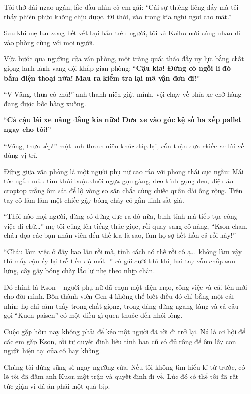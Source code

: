 \documentclass[../main.tex]{subfiles}
\begin{document}
Tôi thở dài ngao ngán, lắc đầu nhìn cô em gái: ``Cái sự thiêng liêng đấy mà tôi thấy phiền phức không chịu được. Đi thôi, vào trong kia nghỉ ngơi cho mát.''

Sau khi mẹ lau xong hết vết bụi bẩn trên người, tôi và Kaiho mới cùng nhau đi vào phòng cùng với mọi người.

Vừa bước qua ngưỡng cửa văn phòng, một tràng quát tháo đầy uy lực bằng chất giọng lanh lảnh vang dội khắp gian phòng: ``\textbf{Cậu kia! Đừng có ngồi lì đó bấm điện thoại nữa! Mau ra kiểm tra lại mã vận đơn đi!}''

``V-Vâng, thưa cô chủ!'' anh thanh niên giật mình, vội chạy về phía xe chở hàng đang được bốc hàng xuống.

``\textbf{Cả cậu lái xe nâng đằng kia nữa! Đưa xe vào góc kệ số ba xếp pallet ngay cho tôi!}''

``Vâng, thưa sếp!'' một anh thanh niên khác đáp lại, cẩn thận đưa chiếc xe lùi về đúng vị trí.

Đứng giữa văn phòng là một người phụ nữ cao ráo với phong thái cực ngầu: Mái tóc ngắn màu tím khói buộc đuôi ngựa gọn gàng, đeo kính gọng đen, diện áo croptop trắng ôm sát để lộ vòng eo săn chắc cùng chiếc quần dài ống rộng. Trên tay cô lăm lăm một chiếc gậy bóng chày có gắn đinh sắt giả.

``Thôi nào mọi người, đừng có đứng đực ra đó nữa, bình tĩnh mà tiếp tục công việc đi chứ\dots'' mẹ tôi cũng lên tiếng thúc giục, rồi quay sang cô nàng, ``Kson-chan, cháu dọa các bạn nhân viên đến thế kia là sao, làm họ sợ hết hồn cả rồi này!''

``Cháu làm việc ở đây bao lâu rồi mà, tính cách nó thế rồi cô ạ\dots\ không làm vậy thì mấy cậu ấy lại trễ tiến độ mất\dots'' cô gái cười khì khì, hai tay vẫn chắp sau lưng, cây gậy bóng chày lắc lư nhẹ theo nhịp chân.

Đó chính là Kson -- người phụ nữ đã chọn một diện mạo, công việc và cái tên mới cho đời mình. Bốn thành viên Gen 4 không thể biết điều đó chỉ bằng một cái nhìn; họ chỉ cảm thấy trong chất giọng, trong dáng đứng ngang tàng và cả câu gọi ``Kuon-paisen'' có một điều gì quen thuộc đến nhói lòng.

Cuộc gặp hôm nay không phải để kéo một người đã rời đi trở lại. Nó là cơ hội để các em gặp Kson, rồi tự quyết định liệu tình bạn cũ có đủ rộng để ôm lấy con người hiện tại của cô hay không.


Chúng tôi đứng sững sờ ngay ngưỡng cửa. Nếu tôi không tìm hiểu kĩ từ trước, có lẽ tôi đã đấm anh Kuon một trận và quyết định đi về. Lúc đó có thể tôi đã rất tức giận vì đã ăn phải một quả bịp.
\end{document}
